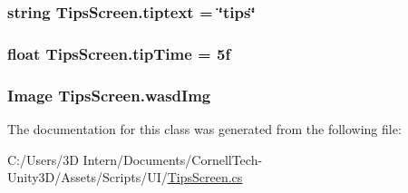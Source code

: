 \subsubsection[{\texorpdfstring{tiptext}{tiptext}}]{\setlength{\rightskip}{0pt plus 5cm}string Tips\+Screen.\+tiptext = \char`\"{}tips\char`\"{}}\hypertarget{class_tips_screen_afebeb53f0de64792e7b5f068fb28b543}{}\label{class_tips_screen_afebeb53f0de64792e7b5f068fb28b543}
\subsubsection[{\texorpdfstring{tip\+Time}{tipTime}}]{\setlength{\rightskip}{0pt plus 5cm}float Tips\+Screen.\+tip\+Time = 5f}\hypertarget{class_tips_screen_a094d8fcfc3c0792b93f8ff1f659e9e4c}{}\label{class_tips_screen_a094d8fcfc3c0792b93f8ff1f659e9e4c}
\subsubsection[{\texorpdfstring{wasd\+Img}{wasdImg}}]{\setlength{\rightskip}{0pt plus 5cm}Image Tips\+Screen.\+wasd\+Img}\hypertarget{class_tips_screen_a47cc9cb69733eeffe9c89abebbb30f11}{}\label{class_tips_screen_a47cc9cb69733eeffe9c89abebbb30f11}


The documentation for this class was generated from the following file\+:\begin{DoxyCompactItemize}
\item 
C\+:/\+Users/3\+D Intern/\+Documents/\+Cornell\+Tech-\/\+Unity3\+D/\+Assets/\+Scripts/\+U\+I/\hyperlink{_tips_screen_8cs}{Tips\+Screen.\+cs}\end{DoxyCompactItemize}
